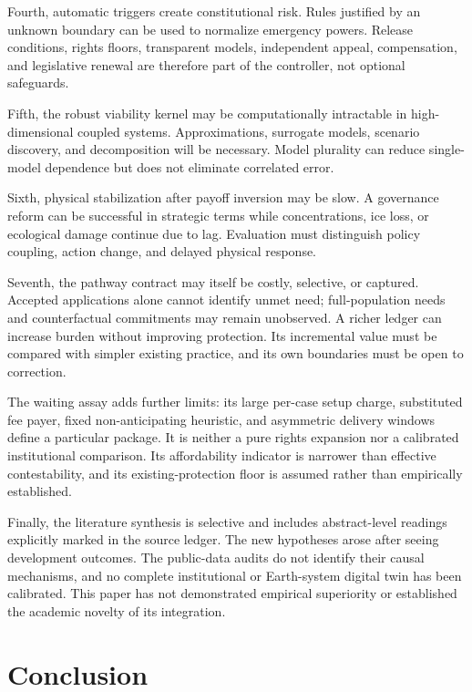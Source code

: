 \documentclass[11pt,a4paper]{article}
\numberwithin{equation}{section}
\theoremstyle{definition}
\theoremstyle{plain}
\theoremstyle{remark}
\begin{document}
Fourth, automatic triggers create constitutional risk. Rules justified by an unknown boundary can be used to normalize emergency powers. Release conditions, rights floors, transparent models, independent appeal, compensation, and legislative renewal are therefore part of the controller, not optional safeguards.

Fifth, the robust viability kernel may be computationally intractable in high-dimensional coupled systems. Approximations, surrogate models, scenario discovery, and decomposition will be necessary. Model plurality can reduce single-model dependence but does not eliminate correlated error.

Sixth, physical stabilization after payoff inversion may be slow. A governance reform can be successful in strategic terms while concentrations, ice loss, or ecological damage continue due to lag. Evaluation must distinguish policy coupling, action change, and delayed physical response.

Seventh, the pathway contract may itself be costly, selective, or captured. Accepted applications alone cannot identify unmet need; full-population needs and counterfactual commitments may remain unobserved. A richer ledger can increase burden without improving protection. Its incremental value must be compared with simpler existing practice, and its own boundaries must be open to correction.

The waiting assay adds further limits: its large per-case setup charge, substituted fee payer, fixed non-anticipating heuristic, and asymmetric delivery windows define a particular package. It is neither a pure rights expansion nor a calibrated institutional comparison. Its affordability indicator is narrower than effective contestability, and its existing-protection floor is assumed rather than empirically established.

Finally, the literature synthesis is selective and includes abstract-level readings explicitly marked in the source ledger. The new hypotheses arose after seeing development outcomes. The public-data audits do not identify their causal mechanisms, and no complete institutional or Earth-system digital twin has been calibrated. This paper has not demonstrated empirical superiority or established the academic novelty of its integration.

\section{Conclusion}
\end{document}
